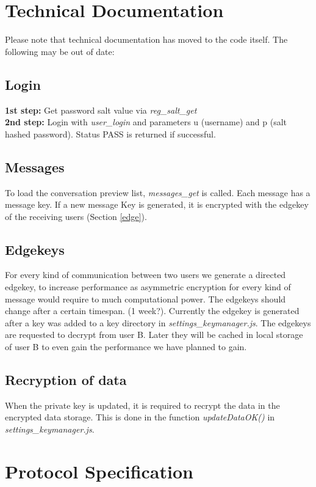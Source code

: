 \documentclass{scrartcl}
\begin{document}
  \section{Technical Documentation}
  Please note that technical documentation has moved to the code itself. The following may be out of date:
\subsection{Login}
\textbf{ 1st step:} Get password salt value via \textit{reg\_salt\_get}\\
\textbf{2nd step:} Login with \textit{user\_login} and parameters u (username) and p (salt hashed password). Status PASS is returned if successful.

\subsection{Messages}
To load the conversation preview list, \textit{messages\_get} is called. Each message has a message key. If a new message Key is generated, it is encrypted with the edgekey of the receiving users (Section \ref{edge}).

\subsection{Edgekeys\label{edge}}
For every kind of communication between two users we generate a directed edgekey, to increase performance as asymmetric encryption for every kind of message would require to much computational power.
The edgekeys should change after a certain timespan. (1 week?). Currently the edgekey is generated after a key was added to a key directory in \textit{settings\_keymanager.js}. The edgekeys are requested to decrypt from user B. Later they will be cached in local storage of user B to even gain the performance we have planned to gain.
\subsection{Recryption of data}
When the private key is updated, it is required to recrypt the data in the encrypted data storage. This is done in the function \textit{updateDataOK()} in \textit{settings\_keymanager.js}.


\section{Protocol Specification}
\end{document}
